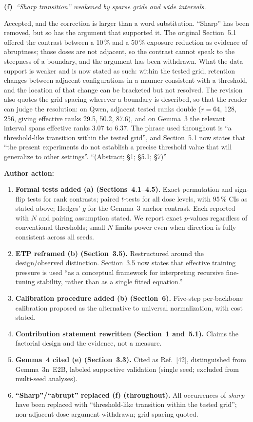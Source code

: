 \documentclass[11pt,a4paper]{article}
\newcommand{\rsub}[2]{%
  \medskip\noindent\textbf{#1}~\textit{#2}\par\smallskip%
}
\newcommand{\arhead}[1]{\medskip\noindent\textbf{#1}\par\smallskip}
\newcommand{\newtext}[1]{\textcolor{chgcolor}{``#1''}}
\begin{document}
\rsub{(f)}{``Sharp transition'' weakened by sparse grids and wide intervals.}
Accepted, and the correction is larger than a word substitution. ``Sharp''
has been removed, but so has the argument that supported it. The original
Section~5.1 offered the contrast between a 10\,\% and a 50\,\% exposure
reduction as evidence of abruptness; those doses are not adjacent, so the
contrast cannot speak to the steepness of a boundary, and the argument
has been withdrawn. What the data support is weaker and is now stated as
such: within the tested grid, retention changes between adjacent
configurations in a manner consistent with a threshold, and the location
of that change can be bracketed but not resolved. The revision also
quotes the grid spacing wherever a boundary is described, so that the
reader can judge the resolution: on Qwen, adjacent tested ranks double
($r=64$, 128, 256, giving effective ranks 29.5, 50.2, 87.6), and on
Gemma~3 the relevant interval spans effective ranks 3.07 to 6.37. The
phrase used throughout is \newtext{a threshold-like transition within the
tested grid}, and Section~5.1 now states that \newtext{the present
experiments do not establish a precise threshold value that will
generalize to other settings}.
\newtext{(Abstract; \S1; \S5.1; \S7)}

\arhead{Author action:}
\begin{enumerate}[leftmargin=1.4em,itemsep=0.3em]
\item \textbf{Formal tests added (a) (Sections~4.1--4.5).}
      Exact permutation and sign-flip tests for rank contrasts; paired
      $t$-tests for all dose levels, with 95\,\% CIs as stated above; Hedges' $g$ for the
      Gemma~3 anchor contrast. Each reported with $N$ and pairing
      assumption stated. We report exact $p$-values regardless
      of conventional thresholds; small $N$ limits power even when
      direction is fully consistent across all seeds.
\item \textbf{ETP reframed (b) (Section~3.5).}
      Restructured around the design/observed distinction.
      Section~3.5 now states that effective training pressure is used \newtext{as a conceptual framework for interpreting recursive fine-tuning stability, rather than as a single fitted equation.}
\item \textbf{Calibration procedure added (b) (Section~6).}
      Five-step per-backbone calibration proposed as the alternative
      to universal normalization, with cost stated.
\item \textbf{Contribution statement rewritten (Section~1 and~5.1).}
      Claims the factorial design and the evidence, not a measure.
\item \textbf{Gemma~4 cited (e) (Section~3.3).}
      Cited as Ref.~[42], distinguished from Gemma~3n~E2B, labeled
      supportive validation (single seed; excluded from multi-seed
      analyses).
\item \textbf{``Sharp''/``abrupt'' replaced (f) (throughout).}
      All occurrences of \textit{sharp} have been replaced with
      \newtext{threshold-like transition within the tested grid};
      non-adjacent-dose argument withdrawn; grid spacing quoted.
\end{enumerate}
\end{document}
